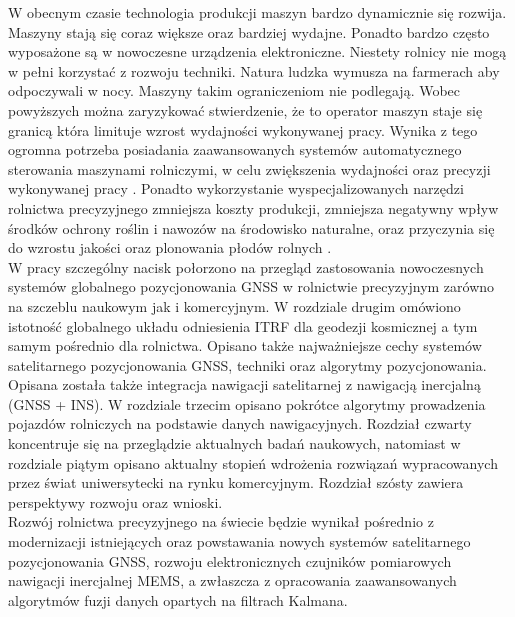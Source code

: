 %
W obecnym czasie technologia produkcji maszyn bardzo dynamicznie się rozwija. 
Maszyny stają się coraz większe oraz bardziej wydajne. 
Ponadto bardzo często wyposażone są w nowoczesne urządzenia elektroniczne. 
Niestety rolnicy nie mogą w pełni korzystać z rozwoju techniki. 
Natura ludzka wymusza na farmerach aby odpoczywali w nocy. Maszyny takim ograniczeniom nie podlegają.
Wobec powyższych można zaryzykować stwierdzenie, że to operator maszyn staje się granicą która limituje wzrost wydajności wykonywanej pracy.
Wynika z tego ogromna potrzeba posiadania zaawansowanych systemów automatycznego sterowania maszynami rolniczymi,
w celu zwiększenia wydajności oraz precyzji wykonywanej pracy \cite{CCTA_769_775}. 
Ponadto wykorzystanie wyspecjalizowanych narzędzi rolnictwa precyzyjnego zmniejsza koszty produkcji,
zmniejsza negatywny wpływ środków ochrony roślin i nawozów na środowisko naturalne, 
oraz przyczynia się do wzrostu jakości oraz plonowania płodów rolnych \cite{CCTA_943_950}.\\
\indent W pracy szczególny nacisk połorzono na przegląd zastosowania nowoczesnych systemów globalnego pozycjonowania GNSS w rolnictwie precyzyjnym 
zarówno na szczeblu naukowym jak i komercyjnym. W rozdziale drugim omówiono istotność globalnego układu odniesienia ITRF dla geodezji kosmicznej a tym samym pośrednio 
dla rolnictwa. Opisano także najważniejsze cechy systemów satelitarnego pozycjonowania GNSS, techniki oraz algorytmy pozycjonowania. Opisana została także 
integracja nawigacji satelitarnej z nawigacją inercjalną (GNSS + INS). W rozdziale trzecim opisano pokrótce algorytmy prowadzenia pojazdów rolniczych na podstawie 
danych nawigacyjnych. Rozdział czwarty koncentruje się na przeglądzie aktualnych badań naukowych, natomiast w rozdziale piątym opisano aktualny stopień wdrożenia 
rozwiązań wypracowanych przez świat uniwersytecki na rynku komercyjnym. Rozdział szósty zawiera perspektywy rozwoju oraz wnioski.\\
\indent Rozwój rolnictwa precyzyjnego na świecie będzie wynikał pośrednio z modernizacji istniejących  oraz powstawania nowych systemów satelitarnego pozycjonowania GNSS,
rozwoju elektronicznych czujników pomiarowych nawigacji inercjalnej MEMS, a zwłaszcza z opracowania zaawansowanych algorytmów fuzji danych opartych na filtrach Kalmana. 
